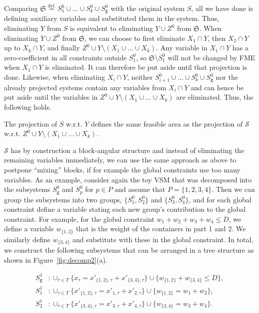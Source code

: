 \documentclass{llncs}
\newcommand{\trt}[1]{\texttt{#1}}
\begin{document}
Comparing $\mathfrak{S} \overset{\text{def.}}{=} S_1^0\cup\ldots\cup S_k^0\cup S_\trt{g}^0$ with the original system $S$, all we have done is defining auxiliary variables and substituted them in the system. Thus, eliminating $Y$ from $S$ is equivalent to eliminating $Y \cup Z^0$ from $\mathfrak{S}$. 
%
When eliminating $Y\cup Z^0$ from $\mathfrak{S}$, we can choose to first eliminate $X_1\cap Y$, then $X_2\cap Y$ up to $X_k\cap Y$, and finally $Z^0\cup Y\setminus(X_1\cup \ldots\cup X_k)$. 
Any variable in $X_1\cap Y$ has a zero-coefficient in all constraints outside $S^0_1$, so $\mathfrak{S}\setminus S^0_1$ will not be changed by FME when $X_1\cap Y$ is eliminated. It can therefore be put aside until that projection is done. 
Likewise, when eliminating $X_i\cap Y$, neither $S_{i+1}^0\cup \ldots \cup S_k^0\cup S_\trt{g}^0$ nor the already projected systems contain any variables from $X_i\cap Y$ and can hence be put aside until the variables in $Z^0\cup Y\setminus(X_1\cup \ldots\cup X_k)$ are eliminated. Thus, the following holds. 
%
\begin{proposition}
The projection of $S$ w.r.t. $Y$ defines the same feasible area as 
the projection of $\mathcal{S}$ w.r.t. $Z^0 \cup Y\setminus (X_1\cup \ldots \cup X_k)$. 
\end{proposition}
%
$\mathcal{S}$ has by construction a block-angular structure and instead of eliminating the remaining variables immediately, we can use the same approach as above to postpone ``mixing'' blocks, if for example the global constraints use too many variables. 
As an example, consider again the toy VSM that was decomposed into the subsystems $S^0_\trt{g}$ and $S^0_p$ for $p\in P$ and assume that $P=\{1,2,3,4\}$. Then we can group the subsystems into two groups, $\{S^0_1, S^0_2\}$ and $\{S^0_3, S^0_4\}$, and for each global constraint define a variable stating each new group's contribution to the global constraint. For example, for the global constraint $w_1 + w_2 + w_3 + w_4 \leq D$, we define a variable $w_{\{1,2\}}$ that is the weight of the containers in part 1 and 2. We similarly define $w_{\{3,4\}}$ and substitute with these in the global constraint. In total, we construct the following subsystems that can be arranged in a tree structure as shown in Figure~\ref{fig:decomp2}(a).
\begin{footnotesize}
\begin{align*}
S_\trt{g}^1 &:\cup_{\tau\in T}\{ x_\tau = x'_{\{1,2\},\tau} + x'_{\{3,4\},\tau}\} \cup \{ w_{\{1,2\}} + w_{\{3,4\}} \leq D \},\\   
S^1_1				&:\cup_{\tau\in T}\{ x'_{\{1,2\},\tau} = x'_{1,\tau} + x'_{2,\tau}\}\cup \{ w_{\{1,2\}} = w_{1} + w_{2}\},\\
S^1_2				&:\cup_{\tau\in T}\{ x'_{\{3,4\},\tau} = x'_{3,\tau} + x'_{4,\tau}\} \cup \{ w_{\{3,4\}} = w_{3} + w_{4}\}. 
\end{align*}
\end{footnotesize}
\end{document}

